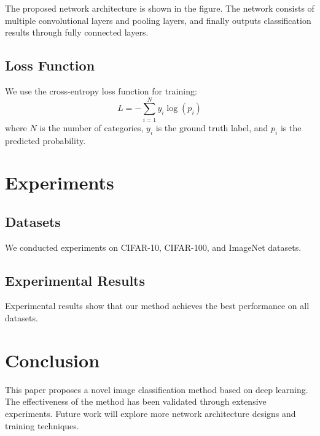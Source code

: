 \documentclass[12pt]{article}
\begin{document}
The proposed network architecture is shown in the figure.
The network consists of multiple convolutional layers and pooling layers, and finally outputs classification results through fully connected layers.

\subsection{Loss Function}

We use the cross-entropy loss function for training:
\begin{equation}
    L = -\sum_{i=1}^{N} y_i \log(p_i)
    \label{eq:loss}
\end{equation}
where $N$ is the number of categories, $y_i$ is the ground truth label, and $p_i$ is the predicted probability.

\section{Experiments}

\subsection{Datasets}

We conducted experiments on CIFAR-10, CIFAR-100, and ImageNet datasets.

\subsection{Experimental Results}

Experimental results show that our method achieves the best performance on all datasets.

\section{Conclusion}

This paper proposes a novel image classification method based on deep learning.
The effectiveness of the method has been validated through extensive experiments.
Future work will explore more network architecture designs and training techniques.
\end{document}
